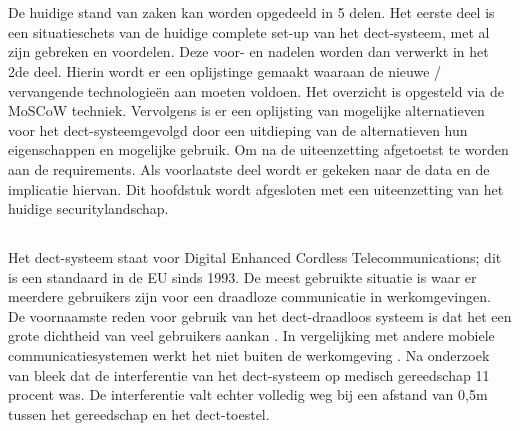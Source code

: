 \chapter{}%
\label{ch:stand-van-zaken}



De huidige stand van zaken kan worden opgedeeld in 5 delen. Het eerste deel is een situatieschets van de huidige complete set-up van het \gls{dect}-systeem, met al zijn gebreken en voordelen. Deze voor- en nadelen worden dan verwerkt in het 2de deel. Hierin wordt er een oplijstinge gemaakt waaraan de nieuwe / vervangende technologieën aan moeten voldoen. Het overzicht is opgesteld via de MoSCoW techniek. Vervolgens is er een oplijsting van mogelijke alternatieven voor het \gls{dect}-systeemgevolgd door een uitdieping van de alternatieven hun eigenschappen en mogelijke gebruik. Om na de uiteenzetting afgetoetst te worden aan de requirements. Als voorlaatste deel wordt er gekeken naar de data en de implicatie hiervan. Dit hoofdstuk wordt afgesloten met een uiteenzetting van het huidige  securitylandschap.

\section{}%
\label{sec:dect-systeem}
Het \gls{dect}-systeem staat voor Digital Enhanced Cordless Telecommunications; dit is een standaard in de EU sinds 1993. De meest gebruikte situatie is waar er meerdere gebruikers zijn voor een draadloze communicatie in werkomgevingen. De voornaamste reden voor gebruik van het \gls{dect}-draadloos systeem is dat het een grote dichtheid van veel gebruikers aankan \autocite{Welinder1997}. In vergelijking met andere mobiele communicatiesystemen werkt het niet buiten de werkomgeving \autocite{Welinder1997}. Na onderzoek van \textcite{Welinder1997} bleek dat de interferentie van het \gls{dect}-systeem op medisch gereedschap 11 procent was. De interferentie valt echter volledig weg bij een afstand van 0,5m tussen het gereedschap en het \gls{dect}-toestel.


